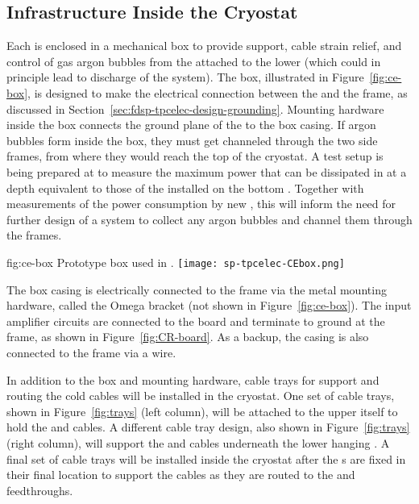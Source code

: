 \subsection{Infrastructure Inside the Cryostat}
\label{sec:fdsp-tpcelec-design-infrastructure}

Each  is enclosed in a mechanical  box 
to provide support, cable strain relief, and control of gas 
argon bubbles %
from the  attached 
to the lower  (which could in principle lead to 
discharge of the  system). The  box, 
illustrated in Figure~\ref{fig:ce-box}, is designed to make the 
electrical connection between the  and the  
frame, as discussed %
in Section~\ref{sec:fdsp-tpcelec-design-grounding}.
Mounting hardware inside the  box connects the ground plane 
of the  to the box casing. If argon bubbles %
form inside
the  box, they must get %
channeled through the two side
 frames, from where they would reach the top of the cryostat.
A test setup is being prepared at  to measure the
maximum power that can be dissipated in  at a
depth equivalent to those of the  installed on
the bottom . Together with measurements of the
power consumption by new , this will inform
the need for further design of a system to collect any
argon bubbles and channel them through the  frames.

\begin{dunefigure}
{fig:ce-box}
{Prototype  box used in .}
\texttt{[image: sp-tpcelec-CEbox.png]}
\end{dunefigure}

The  box casing is electrically connected to the 
 frame via the metal mounting hardware, called the 
Omega bracket (not shown in Figure~\ref{fig:ce-box}). The 
input amplifier circuits  are connected to the  board  
and terminate to ground at the  frame, as 
shown in Figure~\ref{fig:CR-board}.  As a backup, the casing is 
also connected to the  frame via a wire.

In addition to the  box and mounting hardware, cable trays 
for support and routing the cold cables will be installed in the 
cryostat. One set of cable trays, shown in Figure~\ref{fig:trays} 
(left column), will be attached to the upper  itself 
to hold the  and  cables. A different cable 
tray design, also shown in Figure~\ref{fig:trays} (right column), 
will support the  and  cables underneath the 
lower hanging . A final set of cable trays will be 
installed inside the cryostat after the s are 
fixed in their final location to support the cables as they are 
routed to the  and  feedthroughs.

